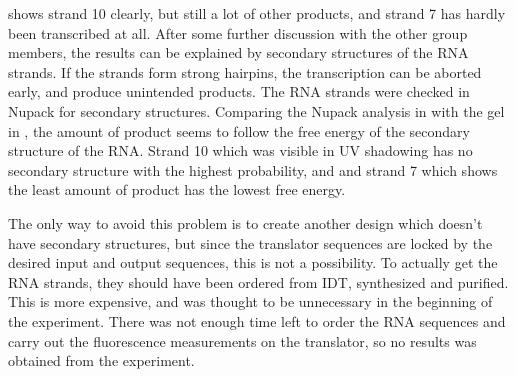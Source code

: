  shows strand 10 clearly, but still a lot of other products, and strand 7 has hardly been transcribed at all. After some further discussion with the other group members, the results can be explained by secondary structures of the RNA strands. If the strands form strong hairpins, the transcription can be aborted early, and produce unintended products. The RNA strands were checked in Nupack for secondary structures. Comparing the Nupack analysis in  with the gel in , the amount of product seems to follow the free energy of the secondary structure of the RNA. Strand 10 which was visible in UV shadowing has no secondary structure with the highest probability, and and strand 7 which shows the least amount of product has the lowest free energy.

The only way to avoid this problem is to create another design which doesn't have secondary structures, but since the translator sequences are locked by the desired input and output sequences, this is not a possibility. To actually get the RNA strands, they should have been ordered from IDT, synthesized and purified. This is more expensive, and was thought to be unnecessary in the beginning of the experiment. There was not enough time left to order the RNA sequences and carry out the fluorescence measurements on the translator, so no results was obtained from the experiment.
